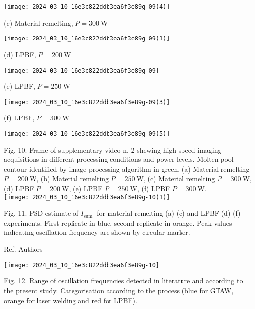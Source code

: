 \documentclass[10pt]{article}
\begin{document}
\begin{center}
\texttt{[image: 2024\_03\_10\_16e3c822ddb3ea6f3e89g-09(4)]}
\end{center}

(c) Material remelting, $P=300 \mathrm{~W}$

\begin{center}
\texttt{[image: 2024\_03\_10\_16e3c822ddb3ea6f3e89g-09(1)]}
\end{center}

(d) LPBF, $P=200 \mathrm{~W}$

\begin{center}
\texttt{[image: 2024\_03\_10\_16e3c822ddb3ea6f3e89g-09]}
\end{center}

(e) LPBF, $P=250 \mathrm{~W}$

\begin{center}
\texttt{[image: 2024\_03\_10\_16e3c822ddb3ea6f3e89g-09(3)]}
\end{center}

(f) LPBF, $P=300 \mathrm{~W}$

\begin{center}
\texttt{[image: 2024\_03\_10\_16e3c822ddb3ea6f3e89g-09(5)]}
\end{center}

Fig. 10. Frame of supplementary video n. 2 showing high-speed imaging acquisitions in different processing conditions and power levels. Molten pool contour identified by image processing algorithm in green. (a) Material remelting $P=200 \mathrm{~W}$, (b) Material remelting $P=250 \mathrm{~W}$, (c) Material remelting $P=300 \mathrm{~W}$, (d) LPBF $P=200 \mathrm{~W}$, (e) LPBF $P=250 \mathrm{~W}$, (f) LPBF $P=300 \mathrm{~W}$.\\
\texttt{[image: 2024\_03\_10\_16e3c822ddb3ea6f3e89g-10(1)]}

Fig. 11. PSD estimate of $I_{\text {sum }}$ for material remelting (a)-(c) and LPBF (d)-(f) experiments. First replicate in blue, second replicate in orange. Peak values indicating oscillation frequency are shown by circular marker.

Ref. Authors

\begin{center}
\texttt{[image: 2024\_03\_10\_16e3c822ddb3ea6f3e89g-10]}
\end{center}

Fig. 12. Range of oscillation frequencies detected in literature and according to the present study. Categorisation according to the process (blue for GTAW, orange for laser welding and red for LPBF).
\end{document}

